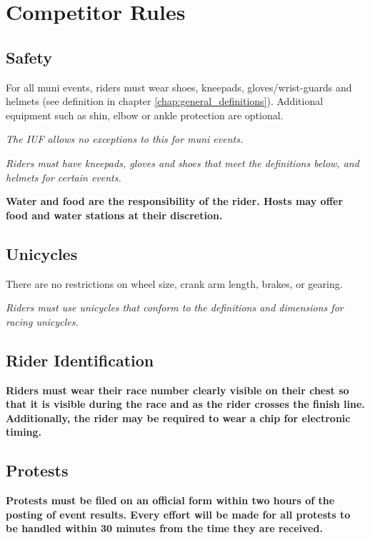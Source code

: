 \chapter{Competitor Rules}

\section{Safety}
For all muni events, riders must wear shoes, kneepads, gloves/wrist-guards and helmets (see definition in chapter \ref{chap:general_definitions}). Additional equipment such as shin, elbow or ankle protection are optional.

\textit{The IUF allows no exceptions to this for muni events.}

\textit{Riders must have kneepads, gloves and shoes that meet the definitions below, and helmets for certain events.}

\textbf{Water and food are the responsibility of the rider. Hosts may offer food and water stations at their discretion.}

\section{Unicycles}

There are no restrictions on wheel size, crank arm length, brakes, or gearing.

\textit{
Riders must use unicycles that conform to the definitions and dimensions for racing unicycles.}

\section{Rider Identification}

\textbf{Riders must wear their race number clearly visible on their chest so that it is visible during the race and as the rider crosses the finish line.  Additionally, the rider may be required to wear a chip for electronic timing.}

\section{Protests}

\textbf{Protests must be filed on an official form within two hours of the posting of event results. Every effort will be made for all protests to be handled within 30 minutes from the time they are received.}

